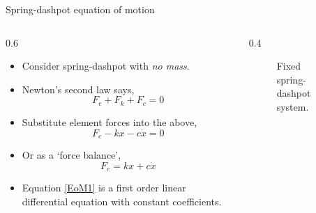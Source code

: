 \documentclass[11pt,aspectratio=169,handout]{beamer}
\begin{document}
\begin{frame}[c]{Spring-dashpot equation of motion}
	\begin{columns}[T]
		\begin{column}{0.6\textwidth}
			\begin{itemize}
				\item Consider spring-dashpot with \textit{no mass}.
				\item Newton's second law says,
				\begin{equation}
					F_e + F_k + F_c = 0
				\end{equation}
				\item Substitute element forces into the above,
				\begin{equation}
					F_e -kx -c\dot{x} = 0
				\end{equation} 
				\item Or as a `force balance', 
				\begin{equation}\label{EoM1}
					F_e = kx + c\dot{x}
				\end{equation}
			\item Equation \ref{EoM1} is a first order linear differential equation with constant coefficients. 
			\end{itemize}
		\end{column}
		\begin{column}{0.4\textwidth}
			\begin{figure}
				\centering
				
				\caption{Fixed spring-dashpot system.}
			\end{figure}
		\end{column}
	\end{columns}
\end{frame}
\end{document}
